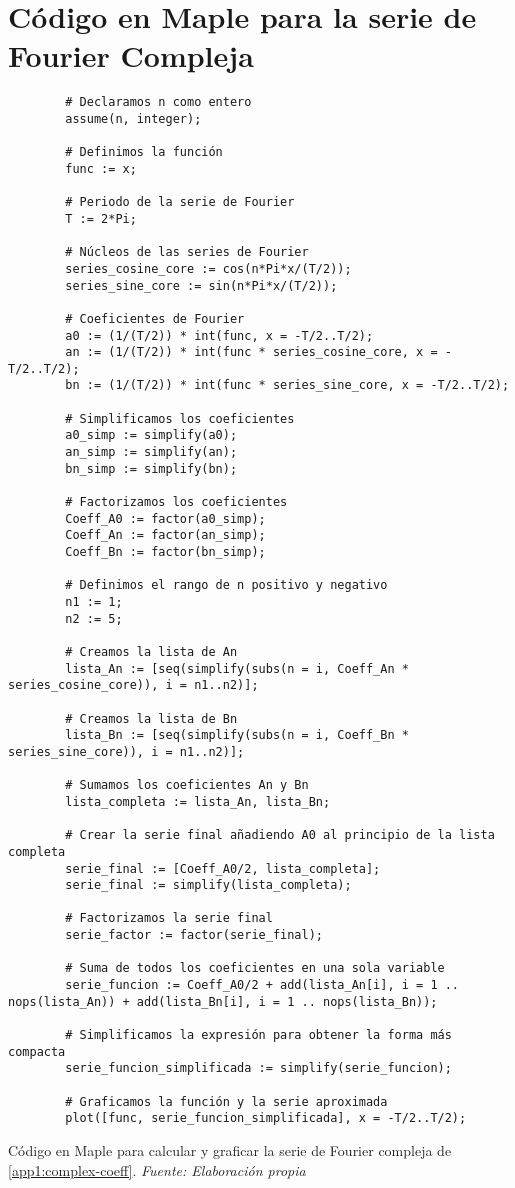 \section{Código en Maple para la serie de Fourier Compleja}\label{app2:complex-code-maple}
\begin{longlisting}
	\begin{verbatim}
		# Declaramos n como entero
		assume(n, integer);
		
		# Definimos la función
		func := x;
		
		# Periodo de la serie de Fourier
		T := 2*Pi;
		
		# Núcleos de las series de Fourier
		series_cosine_core := cos(n*Pi*x/(T/2));
		series_sine_core := sin(n*Pi*x/(T/2));
		
		# Coeficientes de Fourier
		a0 := (1/(T/2)) * int(func, x = -T/2..T/2);
		an := (1/(T/2)) * int(func * series_cosine_core, x = -T/2..T/2);
		bn := (1/(T/2)) * int(func * series_sine_core, x = -T/2..T/2);
		
		# Simplificamos los coeficientes
		a0_simp := simplify(a0);
		an_simp := simplify(an);
		bn_simp := simplify(bn);
		
		# Factorizamos los coeficientes
		Coeff_A0 := factor(a0_simp);
		Coeff_An := factor(an_simp);
		Coeff_Bn := factor(bn_simp);
		
		# Definimos el rango de n positivo y negativo
		n1 := 1;
		n2 := 5;
		
		# Creamos la lista de An
		lista_An := [seq(simplify(subs(n = i, Coeff_An * series_cosine_core)), i = n1..n2)];
		
		# Creamos la lista de Bn
		lista_Bn := [seq(simplify(subs(n = i, Coeff_Bn * series_sine_core)), i = n1..n2)];
		
		# Sumamos los coeficientes An y Bn
		lista_completa := lista_An, lista_Bn;
		
		# Crear la serie final añadiendo A0 al principio de la lista completa
		serie_final := [Coeff_A0/2, lista_completa];
		serie_final := simplify(lista_completa);
		
		# Factorizamos la serie final
		serie_factor := factor(serie_final);
		
		# Suma de todos los coeficientes en una sola variable
		serie_funcion := Coeff_A0/2 + add(lista_An[i], i = 1 .. nops(lista_An)) + add(lista_Bn[i], i = 1 .. nops(lista_Bn));
		
		# Simplificamos la expresión para obtener la forma más compacta
		serie_funcion_simplificada := simplify(serie_funcion);
		
		# Graficamos la función y la serie aproximada
		plot([func, serie_funcion_simplificada], x = -T/2..T/2);	
	\end{verbatim}
	\caption[Código en Maple para calcular y graficar la serie de Fourier compleja de \ref{app1:complex-coeff}.] {Código en Maple para calcular y graficar la serie de Fourier compleja de \ref{app1:complex-coeff}. \textit{Fuente: Elaboración propia}} 
\end{longlisting}


